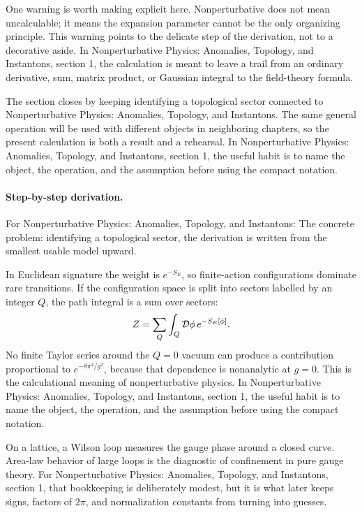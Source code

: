 One warning is worth making explicit here.  Nonperturbative does not mean uncalculable; it means the expansion parameter cannot be the only organizing principle.  This warning points to the delicate step of the derivation, not to a decorative aside.  In Nonperturbative Physics: Anomalies, Topology, and Instantons, section 1, the calculation is meant to leave a trail from an ordinary derivative, sum, matrix product, or Gaussian integral to the field-theory formula.

The section closes by keeping identifying a topological sector connected to Nonperturbative Physics: Anomalies, Topology, and Instantons.  The same general operation will be used with different objects in neighboring chapters, so the present calculation is both a result and a rehearsal.  In Nonperturbative Physics: Anomalies, Topology, and Instantons, section 1, the useful habit is to name the object, the operation, and the assumption before using the compact notation.



\paragraph{Step-by-step derivation.}

For Nonperturbative Physics: Anomalies, Topology, and Instantons: The concrete problem: identifying a topological sector, the derivation is written from the smallest usable model upward.

In Euclidean signature the weight is \(e^{-S_E}\), so finite-action configurations dominate rare transitions.  If the configuration space is split into sectors labelled by an integer \(Q\), the path integral is a sum over sectors:
\[
  Z=\sum_Q\int_Q\mathcal D\phi\,e^{-S_E[\phi]}.
\]
No finite Taylor series around the \(Q=0\) vacuum can produce a contribution proportional to \(e^{-8\pi^2/g^2}\), because that dependence is nonanalytic at \(g=0\).  This is the calculational meaning of nonperturbative physics.  In Nonperturbative Physics: Anomalies, Topology, and Instantons, section 1, the useful habit is to name the object, the operation, and the assumption before using the compact notation.

On a lattice, a Wilson loop measures the gauge phase around a closed curve.  Area-law behavior of large loops is the diagnostic of confinement in pure gauge theory.  For Nonperturbative Physics: Anomalies, Topology, and Instantons, section 1, that bookkeeping is deliberately modest, but it is what later keeps signs, factors of \(2\pi\), and normalization constants from turning into guesses.

